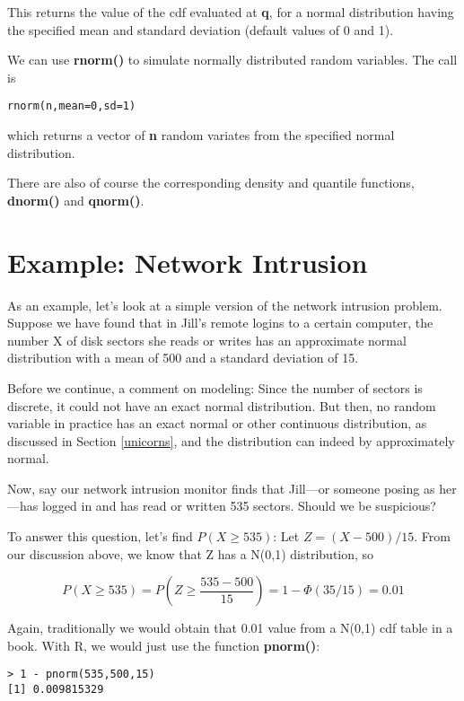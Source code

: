 This returns the value of the cdf evaluated at {\bf q}, for a normal
distribution having the specified mean and standard deviation (default
values of 0 and 1).

We can use {\bf rnorm()} to simulate normally distributed random
variables.  The call is 

\begin{Verbatim}[fontsize=\relsize{-2}]
rnorm(n,mean=0,sd=1)
\end{Verbatim}

which returns a vector of {\bf n} random variates from the specified
normal distribution.

There are also of course the corresponding density and quantile
functions, {\bf dnorm()} and {\bf qnorm()}.

\section{Example:  Network Intrusion}
\label{netintrude}

As an example, let's look at a simple version of the network intrusion
problem.  Suppose we have found that in Jill's remote logins to a
certain computer, the number X of disk sectors she reads or writes has
an approximate normal distribution with a mean of 500 and a standard
deviation of 15.

Before we continue, a comment on modeling: Since the number of sectors
is discrete, it could not have an exact normal distribution. But then,
no random variable in practice has an exact normal or other continuous
distribution, as discussed in Section \ref{unicorns}, and the
distribution can indeed by approximately normal.

Now, say our network intrusion monitor finds that Jill---or someone
posing as her---has logged in and has read or written 535 sectors.
Should we be suspicious?  

To answer this question, let's find $P(X \geq 535)$:  Let $Z =
(X-500)/15$.  From our discussion above, we know that Z has a N(0,1)
distribution, so

\begin{equation}
P(X \geq 535) = P \left (Z \geq \frac{535-500}{15} \right ) 
= 1 - \Phi(35/15) = 0.01
\end{equation}

Again, traditionally we would obtain that 0.01 value from a N(0,1) cdf
table in a book.  With R, we would just use the function {\bf pnorm()}:

\begin{Verbatim}[fontsize=\relsize{-2}]
> 1 - pnorm(535,500,15)
[1] 0.009815329
\end{Verbatim}

